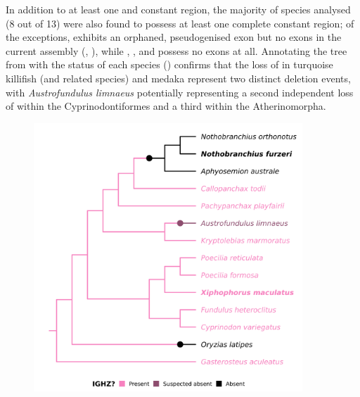 In addition to at least one  and  constant region, the majority of species analysed (8 out of 13) were also found to possess at least one complete  constant region; of the exceptions,  exhibits an orphaned, pseudogenised  exon but no \cz{} exons in the current assembly (, ), while , , \Nfu and  possess no  exons at all. Annotating the tree from  with the  status of each species () confirms that the loss of  in turquoise killifish (and related species) and medaka represent two distinct deletion events, with \textit{Austrofundulus limnaeus} potentially representing a second independent loss of  within the Cyprinodontiformes and a third within the Atherinomorpha.

\begin{figure}
\centering
\includegraphics[width=0.9\textwidth]{_Figures/png/species-tree-large-ighz}
\label{fig:species-tree-large-ighz}
\end{figure}

